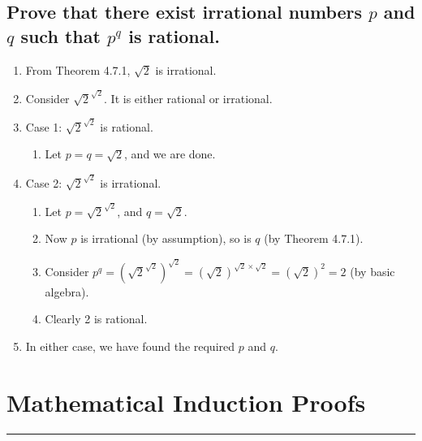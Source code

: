 \documentclass{article}
\begin{document}
\subsection*{Prove that there exist irrational numbers $p$ and $q$ such that $p^q$ is rational.}
\begin{enumerate}
    \item From Theorem 4.7.1, $\sqrt{2}$ is irrational. 
    \item Consider $\sqrt{2}^{\sqrt{2}}$. It is either rational or irrational. 
    \item Case 1: $\sqrt{2}^{\sqrt{2}}$ is rational.
    \begin{enumerate}
        \item Let $p=q=\sqrt{2}$, and we are done. 
    \end{enumerate}
    \item Case 2: $\sqrt{2}^{\sqrt{2}}$ is irrational.
    \begin{enumerate}
        \item Let $p=\sqrt{2}^{\sqrt{2}}$, and $q={\sqrt{2}}$.
        \item Now $p$ is irrational (by assumption), so is $q$ (by Theorem 4.7.1).
        \item Consider $p^q=(\sqrt{2}^{\sqrt{2}})^{\sqrt{2}}=(\sqrt{2})^{\sqrt{2}\times\sqrt{2}}=(\sqrt{2})^2=2$ (by basic algebra).
        \item Clearly 2 is rational. 
    \end{enumerate}
    \item In either case, we have found the required $p$ and $q$. 
\end{enumerate}

\vspace{0.1cm}

\endgroup


\newpage
\begingroup

\renewcommand{\labelenumii}{\arabic{enumi}.\arabic{enumii}}
\renewcommand{\labelenumiii}{\arabic{enumi}.\arabic{enumii}.\arabic{enumiii}}
\renewcommand{\labelenumiv}{\arabic{enumi}.\arabic{enumii}.\arabic{enumiii}.\arabic{enumiv}}

\section*{Mathematical Induction Proofs}
\hrule
\vspace{0.5cm}
\end{document}
